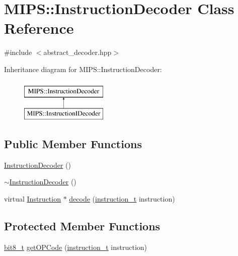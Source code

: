 \hypertarget{classMIPS_1_1InstructionDecoder}{}\section{M\+I\+PS\+:\+:Instruction\+Decoder Class Reference}
\label{classMIPS_1_1InstructionDecoder}


{\ttfamily \#include $<$abstract\+\_\+decoder.\+hpp$>$}

Inheritance diagram for M\+I\+PS\+:\+:Instruction\+Decoder\+:\begin{figure}[H]
\begin{center}
\leavevmode
\includegraphics[height=2.000000cm]{classMIPS_1_1InstructionDecoder}
\end{center}
\end{figure}
\subsection*{Public Member Functions}
\begin{DoxyCompactItemize}
\item 
\hyperlink{classMIPS_1_1InstructionDecoder_a7078c9cef7be0fe76cabe781337f1b04}{Instruction\+Decoder} ()
\item 
\hyperlink{classMIPS_1_1InstructionDecoder_a148a38deb0745a55bbd927d186f93c89}{$\sim$\+Instruction\+Decoder} ()
\item 
virtual \hyperlink{classMIPS_1_1Instruction}{Instruction} $\ast$ \hyperlink{classMIPS_1_1InstructionDecoder_a2058d55e4f24c97674e97a08e53f2d17}{decode} (\hyperlink{core_8hpp_aa514fd240a0e29abb2a2e4c805d7f1a4}{instruction\+\_\+t} instruction)
\end{DoxyCompactItemize}
\subsection*{Protected Member Functions}
\begin{DoxyCompactItemize}
\item 
\hyperlink{core_8hpp_a6074bae122ae7b527864eec42c728c3c}{bit8\+\_\+t} \hyperlink{classMIPS_1_1InstructionDecoder_a9ba2a37411b5e8d4e7b03c4d5b50399b}{get\+O\+P\+Code} (\hyperlink{core_8hpp_aa514fd240a0e29abb2a2e4c805d7f1a4}{instruction\+\_\+t} instruction)
\end{DoxyCompactItemize}
